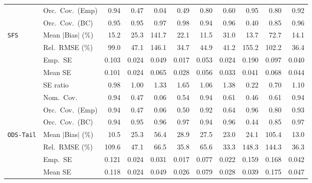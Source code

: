 \begin{landscape}
\begin{longtable}{llrrrrrrrrr}
 & Orc.\ Cov.\ (Emp) & \cellcolor{ranktwo}0.94 & 0.47 & 0.04 & 0.49 & 0.80 & 0.60 & \cellcolor{rankone}0.95 & 0.80 & \cellcolor{rankthree}0.92 \\
 & Orc.\ Cov.\ (BC) & \cellcolor{rankone}0.95 & \cellcolor{ranktwo}0.95 & \cellcolor{rankthree}0.97 & 0.98 & \cellcolor{ranktwo}0.94 & \cellcolor{ranktwo}0.96 & 0.40 & 0.85 & \cellcolor{ranktwo}0.96 \\
\addlinespace[2pt]
\quad \texttt{SFS} & Mean $|$Bias$|$ (\%) & 15.2 & 25.3 & 141.7 & 22.1 & \cellcolor{rankone}11.5 & 31.0 & \cellcolor{ranktwo}13.7 & 72.7 & \cellcolor{rankthree}14.1 \\
 & Rel.\ RMSE (\%) & 99.0 & 47.1 & 146.1 & \cellcolor{rankone}34.7 & 44.9 & \cellcolor{rankthree}41.2 & 155.2 & 102.2 & \cellcolor{ranktwo}36.4 \\
 & Emp.\ SE & 0.103 & 0.024 & 0.049 & 0.017 & 0.053 & 0.024 & 0.190 & 0.097 & 0.040 \\
 & Mean SE & 0.101 & 0.024 & 0.065 & 0.028 & 0.056 & 0.033 & 0.041 & 0.068 & 0.044 \\
 & SE ratio & \cellcolor{ranktwo}0.98 & \cellcolor{rankone}1.00 & 1.33 & 1.65 & \cellcolor{rankthree}1.06 & 1.38 & 0.22 & 0.70 & 1.10 \\
 & Nom.\ Cov. & \cellcolor{rankone}0.94 & 0.47 & 0.06 & \cellcolor{rankthree}0.54 & \cellcolor{rankone}0.94 & \cellcolor{ranktwo}0.61 & 0.46 & \cellcolor{ranktwo}0.61 & \cellcolor{rankone}0.94 \\
 & Orc.\ Cov.\ (Emp) & \cellcolor{rankone}0.94 & 0.47 & 0.06 & 0.50 & \cellcolor{rankthree}0.92 & 0.64 & \cellcolor{rankone}0.96 & 0.80 & \cellcolor{ranktwo}0.93 \\
 & Orc.\ Cov.\ (BC) & \cellcolor{rankone}0.94 & \cellcolor{rankone}0.95 & \cellcolor{rankone}0.96 & \cellcolor{rankthree}0.97 & \cellcolor{rankone}0.94 & \cellcolor{rankone}0.96 & 0.44 & 0.85 & \cellcolor{ranktwo}0.97 \\
\addlinespace[2pt]
\quad \texttt{ODS-Tail} & Mean $|$Bias$|$ (\%) & \cellcolor{rankone}10.5 & 25.3 & 56.4 & 28.9 & 27.5 & \cellcolor{rankthree}23.0 & 24.1 & 105.4 & \cellcolor{ranktwo}13.0 \\
 & Rel.\ RMSE (\%) & 109.6 & 47.1 & 66.5 & \cellcolor{ranktwo}35.8 & 65.6 & \cellcolor{rankone}33.3 & 148.3 & 144.3 & \cellcolor{rankthree}36.3 \\
 & Emp.\ SE & 0.121 & 0.024 & 0.031 & 0.017 & 0.077 & 0.022 & 0.159 & 0.168 & 0.042 \\
 & Mean SE & 0.118 & 0.024 & 0.049 & 0.026 & 0.079 & 0.028 & 0.039 & 0.175 & 0.047 \\

\end{longtable}
\end{landscape}
